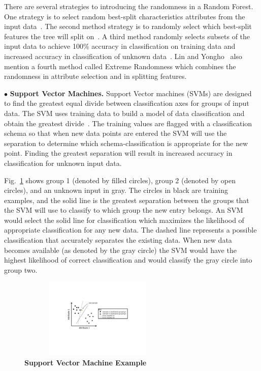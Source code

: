 \documentclass[conference]{IEEEtran}
\begin{document}
There are several strategies to introducing the randomness in a Random Forest. One strategy is to select random best-split characteristics attributes from the input data~\cite{Breiman:01}. The second method strategy is to randomly select which best-split features the tree will split on~\cite{Dietterich:2000}. A third method randomly selects subsets of the input data to achieve 100\% accuracy in classification on training data and increased accuracy in classification of unknown data~\cite{Ho:98}.
Lin and Yongho~\cite{Lin:06} also mention a fourth method called Extreme Randomness which combines the randomness in attribute selection and in splitting features.

$\bullet$ {\bf Support Vector Machines.}
Support Vector machines (SVMs) are designed to find the greatest equal divide between classification axes for groups of input data. The SVM uses training data to build a model of data classification and obtain the greatest divide~\cite{Hoffert:10}. The training values are flagged with a classification schema so that when new data points are entered the SVM will use the separation to determine which schema-classification is appropriate for the new point. Finding the greatest separation will result in increased accuracy in classification for unknown input data.

	Fig.~\ref{Fig:SVM} shows group 1 (denoted by filled circles), group 2 (denoted by open circles), and an unknown input in gray. The circles in black are training examples, and the solid line is the greatest separation between the groups that the SVM will use to classify to which group the new entry belongs. An SVM would select the solid line for classification which maximizes the likelihood of appropriate classification for any new data. The dashed line represents a possible classification that accurately separates the existing data. When new data becomes available (as denoted by the gray circle) the SVM would have the highest likelihood of correct classification and would classify the gray circle into group two.

\begin{figure}[t]
	\centering
	\includegraphics[height=1.5in, width=3in]{SVM.pdf}
	\caption{\bf Support Vector Machine Example}
	\label{Fig:SVM}
\end{figure}
\end{document}
